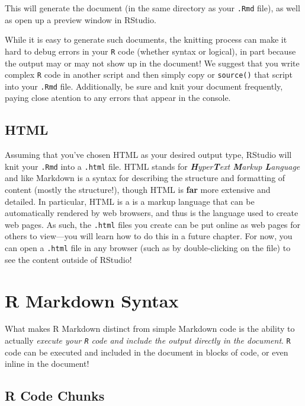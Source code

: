 \documentclass[]{book}
\theoremstyle{definition}
\theoremstyle{definition}
\theoremstyle{remark}
\begin{document}
This will generate the document (in the same directory as your
\texttt{.Rmd} file), as well as open up a preview window in RStudio.

While it is easy to generate such documents, the knitting process can
make it hard to debug errors in your \texttt{R} code (whether syntax or
logical), in part because the output may or may not show up in the
document! We suggest that you write complex \texttt{R} code in another
script and then simply copy or \texttt{source()} that script into your
\texttt{.Rmd} file. Additionally, be sure and knit your document
frequently, paying close atention to any errors that appear in the
console.

\subsection{HTML}\label{html}

Assuming that you've chosen HTML as your desired output type, RStudio
will knit your \texttt{.Rmd} into a \texttt{.html} file. HTML stands for
\emph{\textbf{H}yper\textbf{T}ext \textbf{M}arkup \textbf{L}anguage} and
like Markdown is a syntax for describing the structure and formatting of
content (mostly the structure!), though HTML is \textbf{far} more
extensive and detailed. In particular, HTML is a is a markup language
that can be automatically rendered by web browsers, and thus is the
language used to create web pages. As such, the \texttt{.html} files you
create can be put online as web pages for others to view---you will
learn how to do this in a future chapter. For now, you can open a
\texttt{.html} file in any browser (such as by double-clicking on the
file) to see the content outside of RStudio!

\section{R Markdown Syntax}\label{r-markdown-syntax}

What makes R Markdown distinct from simple Markdown code is the ability
to actually \emph{execute your \texttt{R} code and include the output
directly in the document}. \texttt{R} code can be executed and included
in the document in blocks of code, or even inline in the document!

\subsection{R Code Chunks}\label{r-code-chunks}
\end{document}
